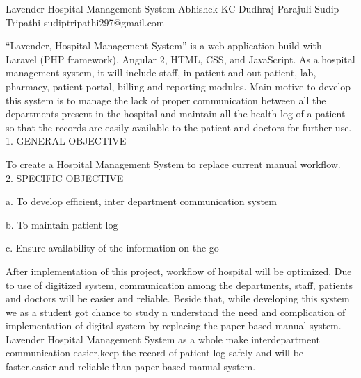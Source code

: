  \begin{conf-abstract}[]
 {Lavender Hospital Management System}
 {Abhishek KC
 	 Dudhraj Parajuli
 	 Sudip Tripathi
 }
{sudiptripathi297@gmail.com}

“Lavender, Hospital Management System” is a web application build with Laravel (PHP framework), Angular 2, HTML, CSS, and JavaScript. As a hospital management system, it will include staff, in-patient and out-patient, lab, pharmacy, patient-portal, billing and reporting modules. Main motive to develop this system is to manage the lack of proper communication between all the departments present in the hospital and maintain all the health log of a patient so that the records are easily available to the patient and doctors for further use.
\\
1. GENERAL OBJECTIVE

To create a Hospital Management System to replace current manual workflow.
\\
2. SPECIFIC OBJECTIVE

a. To develop efficient, inter department communication system

b. To maintain patient log

c. Ensure availability of the information on-the-go

After implementation of this project, workflow of hospital will be optimized. Due to use of digitized system, communication among the departments, staff, patients and doctors will be easier and reliable. Beside that, while developing this system we as a student got chance to study n understand the need and complication of implementation of digital system by replacing the paper based manual system.
Lavender Hospital Management System as a whole make interdepartment communication easier,keep the record of patient log safely and will be faster,easier and reliable than paper-based manual system.  
 \end{conf-abstract}